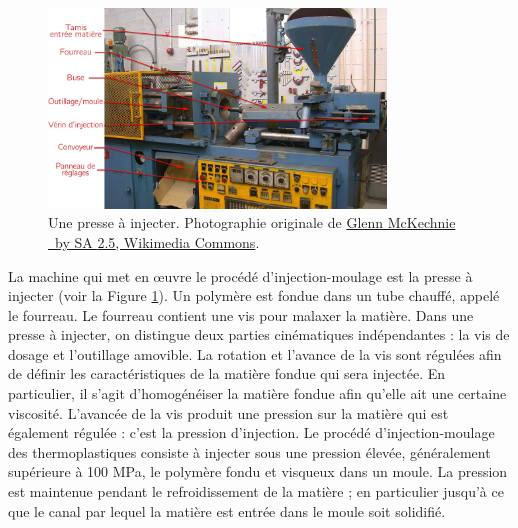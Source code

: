 \begin{figure}[bthp]
	\centering
	\includegraphics[width=0.8\textwidth,height=\textheight,keepaspectratio]{../Chap1/Figures/PlasticsInjectionMoulderJones_annotee.jpg}
	\caption[Une presse à injecter.]{Une presse à injecter. Photographie originale de \href{https://commons.wikimedia.org/wiki/File:PlasticsInjectionMoulderJones.jpg}{Glenn McKechnie \ccLogo \ by SA \textnormal{2.5}, Wikimedia Commons}.}
	\label{fig:PlasticsInjectionMoulderJones}
\end{figure}

La machine qui met en œuvre le procédé d'injection-moulage est la presse à injecter (voir la Figure \ref{fig:PlasticsInjectionMoulderJones}).
Un polymère est fondue dans un tube chauffé, appelé le fourreau.  %
Le fourreau contient une vis pour malaxer la matière.  %
Dans une presse à injecter, on distingue deux parties cinématiques indépendantes : la vis de dosage et l'outillage amovible.
La rotation et l'avance de la vis sont régulées afin de définir les caractéristiques de la matière fondue qui sera injectée.
En particulier, il s'agit d'homogénéiser la matière fondue afin qu'elle ait une certaine viscosité.
L'avancée de la vis produit une pression sur la matière qui est également régulée : c'est la pression d'injection.
Le procédé d’injection-moulage des thermoplastiques consiste à injecter sous une pression élevée, généralement supérieure à 100 MPa, le polymère fondu et visqueux dans un moule.
La pression est maintenue pendant le refroidissement de la matière ; en particulier jusqu'à ce que le canal par lequel la matière est entrée dans le moule soit solidifié.

